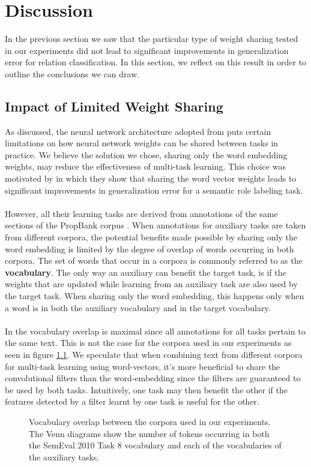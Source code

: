 \chapter{Discussion}
In the previous section we saw that the particular type of weight sharing tested in our experiments did not lead to significant improvements in generalization error for relation classification. In this section, we reflect on this result in order to outline the conclusions we can draw.

\section{Impact of Limited Weight Sharing}
As discussed, the neural network architecture adopted from \citet{nguyen2015} puts certain limitations on how neural network weights can be shared between tasks in practice. We believe the solution we chose, sharing only the word embedding weights, may reduce the effectiveness of multi-task learning. This choice was motivated by \citet{collobert2008} in which they show that sharing the word vector weights leads to significant improvements in generalization error for a semantic role labeling task. 
\\\\
However, all their learning tasks are derived from annotations of the same sections of the PropBank corpus \citep{kingsbury2002}. When annotations for auxiliary tasks are taken from different corpora, the potential benefits made possible by sharing only the word embedding is limited by the degree of overlap of words occurring in both corpora. The set of words that occur in a corpora is commonly referred to as the \textbf{vocabulary}. The only way an auxiliary can benefit the target task, is if the weights that are updated while learning from an auxiliary task are also used by the target task. When sharing only the word embedding, this happens only when a word is in both the auxiliary vocabulary and in the target vocabulary.
\\\\
In \citet{collobert2008} the vocabulary overlap is maximal since all annotations for all tasks pertain to the same text. This is not the case for the corpora used in our experiments as seen in figure \ref{vocab_overlap}. We speculate that when combining text from different corpora for multi-task learning using word-vectors, it's more beneficial to share the convolutional filters than the word-embedding since the filters are guaranteed to be used by both tasks. Intuitively, one task may then benefit the other if the features detected by a filter learnt by one task is useful for the other.
\newpage
\thispagestyle{empty}
\begin{figure}
	\centering
	
	
	
	\caption{Vocabulary overlap between the corpora used in our experiments. The Venn diagrams show the number of tokens occurring in both the SemEval 2010 Task 8 vocabulary and each of the vocabularies of the auxiliary tasks.}
	\label{vocab_overlap}
\end{figure}
\FloatBarrier

